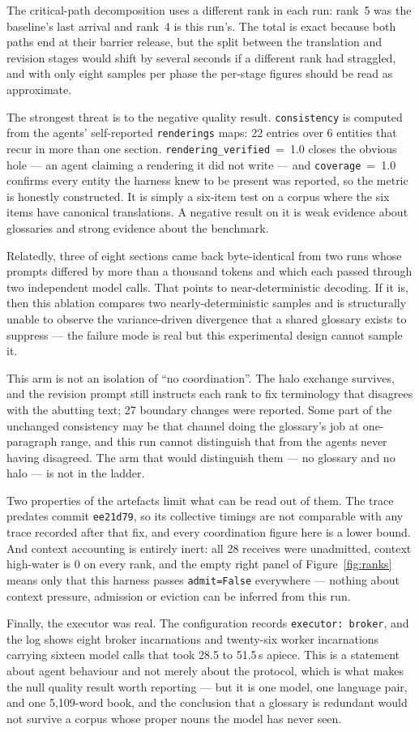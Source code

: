 \documentclass[11pt]{article}
\begin{document}
The critical-path decomposition uses a different rank in each run: rank~5 was the baseline's last
arrival and rank~4 is this run's. The total is exact because both paths end at their barrier
release, but the split between the translation and revision stages would shift by several seconds
if a different rank had straggled, and with only eight samples per phase the per-stage figures
should be read as approximate.

The strongest threat is to the negative quality result. \texttt{consistency} is computed from the
agents' self-reported \texttt{renderings} maps: 22 entries over 6 entities that recur in more than
one section. \texttt{rendering\_verified}~=~1.0 closes the obvious hole --- an agent claiming a
rendering it did not write --- and \texttt{coverage}~=~1.0 confirms every entity the harness knew
to be present was reported, so the metric is honestly constructed. It is simply a six-item test on
a corpus where the six items have canonical translations. A negative result on it is weak evidence
about glossaries and strong evidence about the benchmark.

Relatedly, three of eight sections came back byte-identical from two runs whose prompts differed by
more than a thousand tokens and which each passed through two independent model calls. That points
to near-deterministic decoding. If it is, then this ablation compares two nearly-deterministic
samples and is structurally unable to observe the variance-driven divergence that a shared glossary
exists to suppress --- the failure mode is real but this experimental design cannot sample it.

This arm is not an isolation of ``no coordination''. The halo exchange survives, and the revision
prompt still instructs each rank to fix terminology that disagrees with the abutting text; 27
boundary changes were reported. Some part of the unchanged consistency may be that channel doing
the glossary's job at one-paragraph range, and this run cannot distinguish that from the agents
never having disagreed. The arm that would distinguish them --- no glossary and no halo --- is not
in the ladder.

Two properties of the artefacts limit what can be read out of them. The trace predates commit
\texttt{ee21d79}, so its collective timings are not comparable with any trace recorded after that
fix, and every coordination figure here is a lower bound. And context accounting is entirely
inert: all 28 receives were unadmitted, context high-water is 0 on every rank, and the empty right
panel of Figure~\ref{fig:ranks} means only that this harness passes \texttt{admit=False} everywhere
--- nothing about context pressure, admission or eviction can be inferred from this run.

Finally, the executor was real. The configuration records \texttt{executor: broker}, and the log
shows eight broker incarnations and twenty-six worker incarnations carrying sixteen model calls
that took 28.5 to 51.5\,s apiece. This is a statement about agent behaviour and not merely about
the protocol, which is what makes the null quality result worth reporting --- but it is one model,
one language
pair, and one 5{,}109-word book, and the conclusion that a glossary is redundant would not survive
a corpus whose proper nouns the model has never seen.
\end{document}
